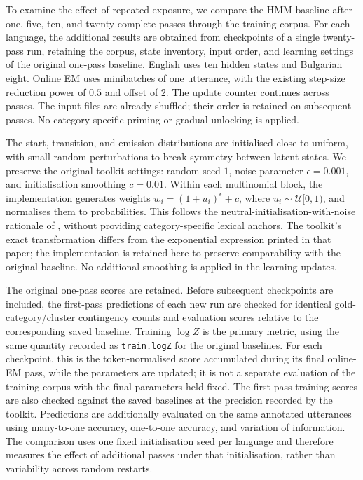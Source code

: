 To examine the effect of repeated exposure, we compare the HMM baseline after one, five, ten, and twenty complete passes through the training corpus. For each language, the additional results are obtained from checkpoints of a single twenty-pass run, retaining the corpus, state inventory, input order, and learning settings of the original one-pass baseline. English uses ten hidden states and Bulgarian eight. Online EM uses minibatches of one utterance, with the existing step-size reduction power of $0.5$ and offset of $2$. The update counter continues across passes. The input files are already shuffled; their order is retained on subsequent passes. No category-specific priming or gradual unlocking is applied.

The start, transition, and emission distributions are initialised close to uniform, with small random perturbations to break symmetry between latent states. We preserve the original toolkit settings: random seed $1$, noise parameter $\epsilon=0.001$, and initialisation smoothing $c=0.01$. Within each multinomial block, the implementation generates weights $w_i=(1+u_i)^{\epsilon}+c$, where $u_i\sim\mathcal{U}[0,1)$, and normalises them to probabilities. This follows the neutral-initialisation-with-noise rationale of \citet[Section~4, footnote~3]{liang-klein-2009-online}, without providing category-specific lexical anchors. The toolkit's exact transformation differs from the exponential expression printed in that paper; the implementation is retained here to preserve comparability with the original baseline. No additional smoothing is applied in the learning updates.

The original one-pass scores are retained. Before subsequent checkpoints are included, the first-pass predictions of each new run are checked for identical gold-category/cluster contingency counts and evaluation scores relative to the corresponding saved baseline. Training $\log Z$ is the primary metric, using the same quantity recorded as \texttt{train.logZ} for the original baselines. For each checkpoint, this is the token-normalised score accumulated during its final online-EM pass, while the parameters are updated; it is not a separate evaluation of the training corpus with the final parameters held fixed. The first-pass training scores are also checked against the saved baselines at the precision recorded by the toolkit. Predictions are additionally evaluated on the same annotated utterances using many-to-one accuracy, one-to-one accuracy, and variation of information. The comparison uses one fixed initialisation seed per language and therefore measures the effect of additional passes under that initialisation, rather than variability across random restarts.
